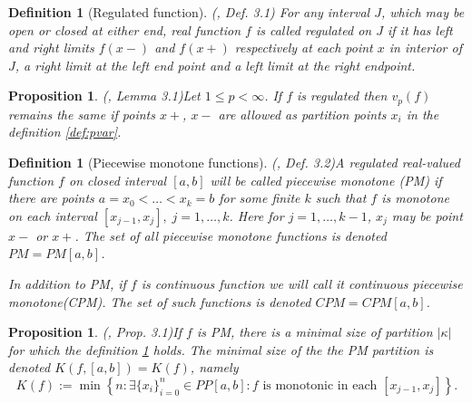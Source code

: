 \documentclass[12pt, a4paper]{article}
\newtheorem{proposition}[theorem]{Proposition}
\newtheorem{definition}[theorem]{Definition}
\numberwithin{equation}{section}
\begin{document}
 

\begin{definition}[Regulated function](\cite{Qian}, Def. 3.1)
  For any interval $J$, which may be open or closed at either end, 
  real function $f$ is called \emph{regulated} on $J$ 
  if it has left and right limits   
  $f(x-)$ and $f(x+)$ respectively at each point $x$ in interior of $J$,
  a right limit at the left end point and a left limit 
  at the right endpoint.
\end{definition}  
 
\begin{proposition}(\cite{Qian}, Lemma 3.1)\label{prop:LimPoints} 
  Let $1 \leq p < \infty$. If $f$ is regulated then $v_{p}(f)$ remains the same
  if points $x+$, $x-$ are allowed as partition points $x_i$ in the definition \ref{def:pvar}.
\end{proposition}  
 
\begin{definition}[Piecewise monotone functions](\cite{Qian}, Def. 3.2)\label{def:PM}
  A regulated real-valued function $f$ on closed interval $[a,b]$ 
  will be called \emph{piecewise monotone} (PM)
  if there are points $a=x_0<\dots<x_k=b$ for some finite $k$ such 
  that $f$ is monotone on each interval $[x_{j-1},x_j],\;j=1,\dots,k$. 
  Here for $j=1,\dots,k-1$, $x_j$ may be point $x-$ or $x+$.
  The set of all piecewise monotone functions is denoted $PM=PM[a,b]$.
  
  In addition to PM, if $f$ is continuous function we will call it 
  continuous piecewise monotone(CPM). 
  The set of such functions is denoted $CPM=CPM[a,b]$. 
\end{definition}   


 
\begin{proposition}(\cite{Qian}, Prop. 3.1)\label{prop:K_f}
  If $f$ is PM, there is a minimal size of partition $|\kappa|$ for which the definition \ref{def:PM} holds.
  The minimal size of the the PM partition is denoted $K(f,[a,b])=K(f)$, namely
  \begin{equation}
  K(f):=\min\left\{n:\exists \{x_{i}\}_{i=0}^{n} \in PP[a,b]:  f \text{ is monotonic in each } [x_{j-1}, x_j]   \right\}.
  \end{equation}
\end{proposition}    
 
\end{document}
